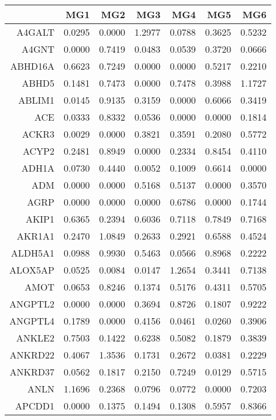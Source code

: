 \begin{longtable}{rrrrrrr}
  \hline
 & MG1 & MG2 & MG3 & MG4 & MG5 & MG6 \\ 
  \hline
A4GALT & 0.0295 & 0.0000 & 1.2977 & 0.0788 & 0.3625 & 0.5232 \\ 
  A4GNT & 0.0000 & 0.7419 & 0.0483 & 0.0539 & 0.3720 & 0.0666 \\ 
  ABHD16A & 0.6623 & 0.7249 & 0.0000 & 0.0000 & 0.5217 & 0.2210 \\ 
  ABHD5 & 0.1481 & 0.7473 & 0.0000 & 0.7478 & 0.3988 & 1.1727 \\ 
  ABLIM1 & 0.0145 & 0.9135 & 0.3159 & 0.0000 & 0.6066 & 0.3419 \\ 
  ACE & 0.0333 & 0.8332 & 0.0536 & 0.0000 & 0.0000 & 0.1814 \\ 
  ACKR3 & 0.0029 & 0.0000 & 0.3821 & 0.3591 & 0.2080 & 0.5772 \\ 
  ACYP2 & 0.2481 & 0.8949 & 0.0000 & 0.2334 & 0.8454 & 0.4110 \\ 
  ADH1A & 0.0730 & 0.4440 & 0.0052 & 0.1009 & 0.6614 & 0.0000 \\ 
  ADM & 0.0000 & 0.0000 & 0.5168 & 0.5137 & 0.0000 & 0.3570 \\ 
  AGRP & 0.0000 & 0.0000 & 0.0000 & 0.6786 & 0.0000 & 0.1744 \\ 
  AKIP1 & 0.6365 & 0.2394 & 0.6036 & 0.7118 & 0.7849 & 0.7168 \\ 
  AKR1A1 & 0.2470 & 1.0849 & 0.2633 & 0.2921 & 0.6588 & 0.4524 \\ 
  ALDH5A1 & 0.0988 & 0.9930 & 0.5463 & 0.0566 & 0.8968 & 0.2222 \\ 
  ALOX5AP & 0.0525 & 0.0084 & 0.0147 & 1.2654 & 0.3441 & 0.7138 \\ 
  AMOT & 0.0653 & 0.8246 & 0.1374 & 0.5176 & 0.4311 & 0.5705 \\ 
  ANGPTL2 & 0.0000 & 0.0000 & 0.3694 & 0.8726 & 0.1807 & 0.9222 \\ 
  ANGPTL4 & 0.1789 & 0.0000 & 0.4156 & 0.0461 & 0.0260 & 0.3906 \\ 
  ANKLE2 & 0.7503 & 0.1422 & 0.6238 & 0.5082 & 0.1879 & 0.3839 \\ 
  ANKRD22 & 0.4067 & 1.3536 & 0.1731 & 0.2672 & 0.0381 & 0.2229 \\ 
  ANKRD37 & 0.0562 & 0.1817 & 0.2150 & 0.7249 & 0.0129 & 0.5715 \\ 
  ANLN & 1.1696 & 0.2368 & 0.0796 & 0.0772 & 0.0000 & 0.7203 \\ 
  APCDD1 & 0.0000 & 0.1375 & 0.1494 & 0.1308 & 0.5957 & 0.8366 \\ 

\end{longtable}
